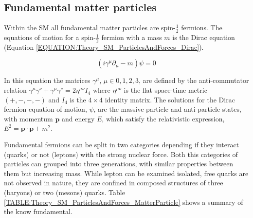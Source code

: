 \subsection{Fundamental matter particles}
\label{SUBSECTION:Theory_SM_ParticlesAndForces}


Within the \gls{SM} all fundamental matter particles are spin-$\frac{1}{2}$ fermions. The equations of motion for a spin-$\frac{1}{2}$ fermion with a mass $m$ is the Dirac equation (Equation \ref{EQUATION:Theory_SM_ParticlesAndForces_Dirac}).

\begin{equation}
(i\gamma^{\mu}\partial_{\mu} - m)\psi = 0
\label{EQUATION:Theory_SM_ParticlesAndForces_Dirac}
\end{equation}

In this equation the matrices $\gamma^{\mu}$, $\mu\in{0,1,2,3}$, are defined by the anti-commutator relation $\gamma^{\mu}\gamma^{\nu}+\gamma^{\mu}\gamma^{\nu} = 2\eta^{\mu\nu}I_{4}$ where $\eta^{\mu\nu}$ is the flat space-time metric $(+,-,-,-)$ and $I_{4}$ is the $4\times4$ identity matrix. The solutions for the Dirac fermion equation of motion, $\psi$, are the massive particle and anti-particle states, with momentum $\mathbf{p}$ and energy $E$, which satisfy the relativistic expression, $E^{2} = \mathbf{p}\cdot\mathbf{p} + m^{2}$.

Fundamental fermions can be split in two categories depending if they interact (quarks) or not (leptons) with the strong nuclear force. Both this categories of particles can grouped into three generations, with similar properties between them but increasing mass. While lepton can be examined isolated, free quarks are not observed in nature, they are confined in composed structures of three (baryons) or two (mesons) quarks. Table \ref {TABLE:Theory_SM_ParticlesAndForces_MatterParticle} shows a summary of the know fundamental.

